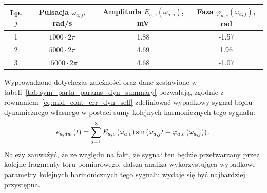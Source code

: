 \begin{table}[htb!]
\begin{center}
\begin{tabular}[c]{| c | c | S[table-format = 1.2] | S[table-format = +1.2] |} \hline
\textbf{Lp. $j$} & \textbf{Pulsacja $\omega_{a,j}$, rad/s} & \textbf{Amplituda $E_{a,e}(\omega_{a,j})$, mV} & \textbf{Faza $\varphi_{a,e}(\omega_{a,j})$, rad} \\  & $1000  \cdot 2\pi$  &  1.88  & -1.57  \\  & $5000  \cdot 2\pi$  &  4.69  &  1.96  \\  & $15000 \cdot 2\pi$  &  4.68  & -1.07  \\ \hline
\end{tabular}
\end{center}
\end{table}

Wyprowadzone dotychczas zależności oraz dane zestawione w tabeli~\ref{tab:sym_parta_params_dyn_summary} pozwalają, zgodnie z równaniem~\eqref{eq:mid_cont_err_dyn_self} zdefiniować wypadkowy sygnał błędu dynamicznego własnego w postaci sumy kolejnych harmonicznych tego sygnału:
\begin{equation}
e_{a,dw} \left(t\right) = \sum _{j=1} ^{3} E_{a,e} \left(\omega_{a,e}\right) \sin \left(\omega_{a,j} t + \varphi_{a,e} \left(\omega_{a,j}\right)\right) \label{eq:sym_parta_dyn_self_sum}.
\end{equation}
Należy zauważyć, że ze względu na fakt, że sygnał ten będzie przetwarzany przez kolejne fragmenty toru pomiarowego, dalsza analiza wykorzystująca wypadkowe parametry kolejnych harmonicznych tego sygnału wydaje się być najbardziej przystępna.

